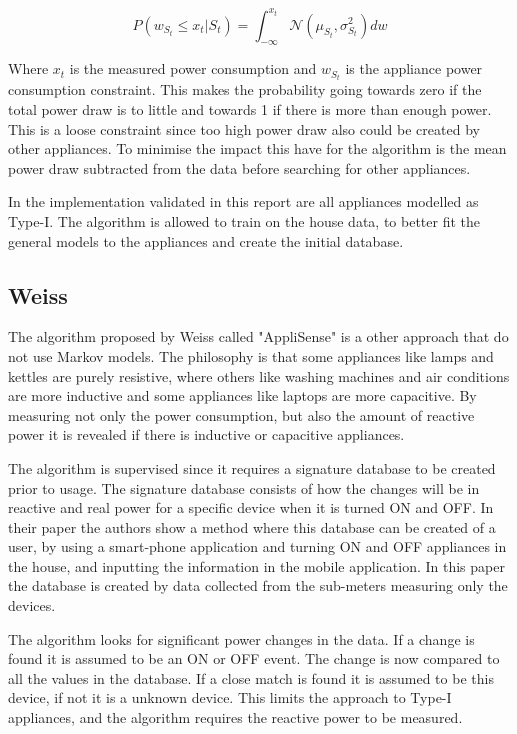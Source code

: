\begin{equation}
	P(w_{S_t} \leq x_t | S_t ) = \int_{-\infty}^{x_t}  \mathcal{N}( \mu_{S_t} , \sigma_{S_t}^2 ) dw
	\label{EQ:PCA}
\end{equation}

Where $x_t$ is the measured power consumption and $w_{S_t}$ is the appliance power consumption constraint. This makes the probability going towards zero if the total power draw is to little and towards 1 if there is more than enough power. This is a loose constraint since too high power draw also could be created by other appliances. To minimise the impact this have for the algorithm is the mean power draw subtracted from the data before searching for other appliances. 

In the implementation validated in this report are all appliances modelled as Type-I. The algorithm is allowed to train on the house data, to better fit the general models to the appliances and create the initial database.

\subsection{Weiss}
The algorithm proposed by Weiss called "AppliSense" is a other approach that do not use Markov models\citep{RefWorks:23}. The philosophy is that some appliances like lamps and kettles are purely resistive, where others like washing machines and air conditions are more inductive and some appliances like laptops are more capacitive. By measuring not only the power consumption, but also the amount of reactive power it is revealed if there is inductive or capacitive appliances.

The algorithm is supervised since it requires a signature database to be created prior to usage. The signature database consists of how the changes will be in reactive and real power for a specific device when it is turned ON and OFF. In their paper the authors show a method where this database can be created of a user, by using a smart-phone application and turning ON and OFF appliances in the house, and inputting the information in the mobile application\citep{RefWorks:23}. In this paper the database is created by data collected from the sub-meters measuring only the devices.  

The algorithm looks for significant power changes in the data. If a change is found it is assumed to be an ON or OFF event. The change is now compared to all the values in the database. If a close match is found it is assumed to be this device, if not it is a unknown device. This limits the approach to Type-I appliances, and the algorithm requires the reactive power to be measured. 

